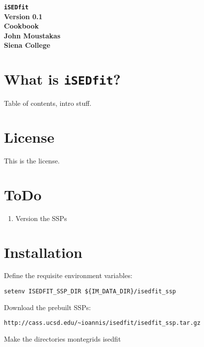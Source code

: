 \documentclass[12pt,preprint]{aastex}
\newcommand{\ised}{{\tt iSEDfit}}
\begin{document}
\vspace*{-10mm} 
\begin{center}
{\Large {\bf \ised}} \\
\vspace*{2mm} 
{\Large {\bf\sc Version 0.1}} \\
\vspace*{2mm} 
{\Large {\bf\sc Cookbook}} \\
\vspace*{0.1in} 
{\Large {\bf\sc John Moustakas}} \\
{\Large {\bf\sc Siena College}} \\
\vspace*{0.1in} 
\end{center}

\section{What is \ised?}

Table of contents, intro stuff.

\section{License}

This is the license.

\section{ToDo}

\begin{enumerate}
\item{Version the SSPs}
\end{enumerate}

\section{Installation}

Define the requisite environment variables:

\begin{verbatim}
setenv ISEDFIT_SSP_DIR ${IM_DATA_DIR}/isedfit_ssp
\end{verbatim}


Download the prebuilt SSPs:

\begin{verbatim}
http://cass.ucsd.edu/~ioannis/isedfit/isedfit_ssp.tar.gz
\end{verbatim}

Make the directories
montegrids
isedfit
\end{document}
